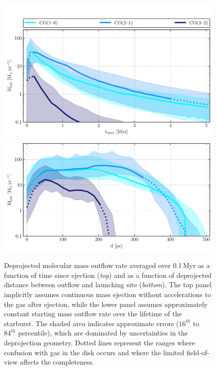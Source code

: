 \begin{figure}
    \centering
    \includegraphics[width=0.8\linewidth]{images/chapters/papers/outflow/outflow_fig8a.pdf}
    \\ \vspace{0.2cm}
    \includegraphics[width=0.8\linewidth]{images/chapters/papers/outflow/outflow_fig8b.pdf}
    \caption[Molecular mass outflow rate]{Deprojected molecular mass outflow rate averaged over 0.1\,Myr as a function of time since ejection (\emph{top}) and as a function of deprojected distance between outflow and launching site (\emph{bottom}). The top panel implicitly assumes continuous mass ejection without accelerations to the gas after ejection,  while the lower panel assumes approximately constant starting mass outflow rate over the lifetime of the starburst. The shaded area indicates approximate errors ($16^{th}$ to $84^{th}$ percentile), which are dominated by uncertainties in the deprojection geometry. Dotted lines represent the ranges where confusion with gas in the disk occurs and where the limited field-of-view affects the completeness.}
    \label{outflow: figure: outflow rate}
\end{figure}

